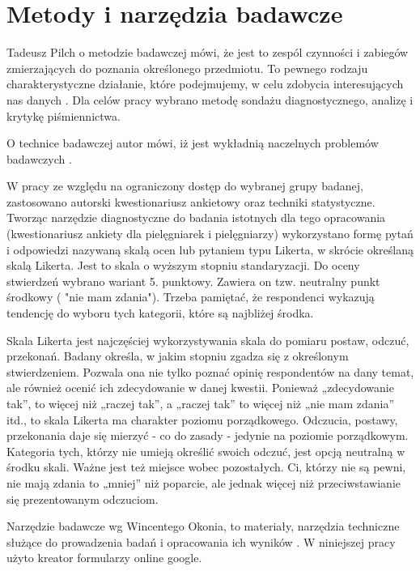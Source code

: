\documentclass[a4paper,12pt,twoside,openany]{report}
\begin{document}
\section{Metody i narzędzia badawcze}
Tadeusz Pilch o metodzie badawczej mówi, że jest to zespól czynności i zabiegów zmierzających do poznania określonego przedmiotu. To pewnego rodzaju charakterystyczne działanie, które podejmujemy, w celu zdobycia interesujących nas danych \cite{tadeusz}. Dla celów pracy wybrano metodę sondażu diagnostycznego, analizę i krytykę piśmiennictwa.\cite{krys}

O technice badawczej autor mówi, iż jest wykładnią naczelnych problemów badawczych \cite{tadeusz}. 

W pracy ze względu na ograniczony dostęp do wybranej grupy badanej, zastosowano autorski kwestionariusz ankietowy oraz techniki statystyczne.
Tworząc narzędzie diagnostyczne do badania istotnych dla tego opracowania (kwestionariusz ankiety dla pielęgniarek i pielęgniarzy) wykorzystano formę pytań i odpowiedzi nazywaną skalą ocen lub pytaniem typu Likerta, w skrócie określaną skalą Likerta. Jest to skala o wyższym stopniu standaryzacji. Do oceny stwierdzeń wybrano wariant 5. punktowy. Zawiera on tzw. neutralny punkt środkowy ( "nie mam zdania"). Trzeba pamiętać, że respondenci wykazują tendencję do wyboru tych kategorii, które są najbliżej środka.

Skala Likerta jest najczęściej wykorzystywania skala do pomiaru postaw, odczuć, przekonań. Badany określa, w jakim stopniu zgadza się z określonym stwierdzeniem. Pozwala ona nie tylko poznać opinię respondentów na dany temat, ale również ocenić ich zdecydowanie w danej kwestii. Ponieważ „zdecydowanie tak”, to więcej niż „raczej tak”, a „raczej tak” to więcej niż „nie mam zdania” itd., to skala Likerta ma charakter poziomu porządkowego. Odczucia, postawy, przekonania daje się mierzyć - co do zasady - jedynie na poziomie porządkowym. Kategoria tych, którzy nie umieją określić swoich odczuć, jest opcją neutralną w środku skali. Ważne jest też miejsce wobec pozostałych. Ci, którzy nie są pewni, nie mają zdania to „mniej” niż poparcie, ale jednak więcej niż przeciwstawianie się prezentowanym odczuciom.

Narzędzie badawcze wg Wincentego Okonia, to materiały, narzędzia techniczne służące do prowadzenia badań i opracowania ich wyników \cite{winc}. W niniejszej pracy użyto kreator formularzy online google.
\end{document}
